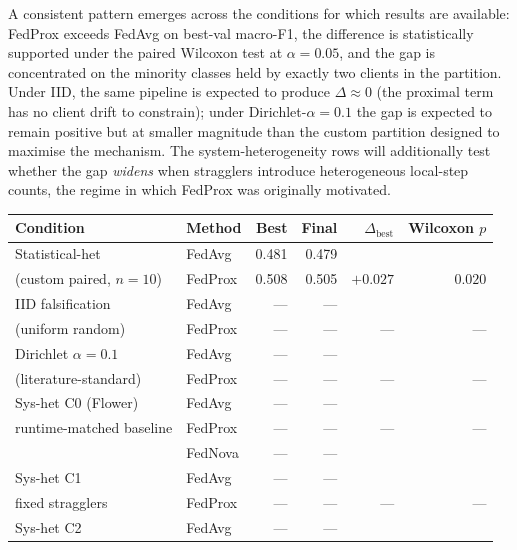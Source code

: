 \documentclass[11pt,a4paper]{article}
\begin{document}
A consistent pattern emerges across the conditions for which results
are available: FedProx exceeds FedAvg on best-val macro-F1, the
difference is statistically supported under the paired Wilcoxon test
at $\alpha = 0.05$, and the gap is concentrated on the minority classes
held by exactly two clients in the partition. Under IID, the same
pipeline is expected to produce $\Delta \approx 0$ (the proximal term
has no client drift to constrain); under Dirichlet-$\alpha = 0.1$ the
gap is expected to remain positive but at smaller magnitude than the
custom partition designed to maximise the mechanism. The
system-heterogeneity rows will additionally test whether the gap
\emph{widens} when stragglers introduce heterogeneous local-step
counts, the regime in which FedProx was originally motivated.

\begin{table}[!htbp]
\centering
\footnotesize
\setlength{\tabcolsep}{6pt}
\begin{tabular}{@{}l l r r r r@{}}
\toprule
Condition & Method & Best & Final & $\Delta_{\text{best}}$ & Wilcoxon $p$ \\
\midrule
Statistical-het            & FedAvg  & 0.481 & 0.479 &         &        \\
(custom paired, $n = 10$)  & FedProx & 0.508 & 0.505 & $+0.027$ & $0.020$ \\
\addlinespace[2pt]
IID falsification          & FedAvg  & ---   & ---   &         &        \\
(uniform random)           & FedProx & ---   & ---   & ---     & ---    \\
\addlinespace[2pt]
Dirichlet $\alpha = 0.1$   & FedAvg  & ---   & ---   &         &        \\
(literature-standard)      & FedProx & ---   & ---   & ---     & ---    \\
\addlinespace[2pt]
Sys-het C0 (Flower)        & FedAvg  & ---   & ---   &         &        \\
runtime-matched baseline   & FedProx & ---   & ---   & ---     & ---    \\
                           & FedNova & ---   & ---   &         &        \\
\addlinespace[2pt]
Sys-het C1                 & FedAvg  & ---   & ---   &         &        \\
fixed stragglers           & FedProx & ---   & ---   & ---     & ---    \\
\addlinespace[2pt]
Sys-het C2                 & FedAvg  & ---   & ---   &         &        \\

\end{tabular}
\end{table}
\end{document}
